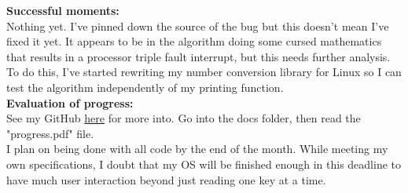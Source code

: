 \documentclass[11pt]{article}
\begin{document}
\textbf{Successful moments:}\\
Nothing yet. I've pinned down the source of the bug but this doesn't mean I've fixed it yet. It appears to be in the algorithm doing some cursed mathematics that results in a processor triple fault interrupt, but this needs further analysis. To do this, I've started rewriting my number conversion library for Linux so I can test the algorithm independently of my printing function.\\
\textbf{Evaluation of progress:}\\
See my GitHub \href{https://github.com/cats64/ibpersonalproject}{here} for more into. Go into the docs folder, then read the "progress.pdf" file.\\
I plan on being done with all code by the end of the month. While meeting my own specifications, I doubt that my OS will be finished enough in this deadline to have much user interaction beyond just reading one key at a time.
\end{document}
